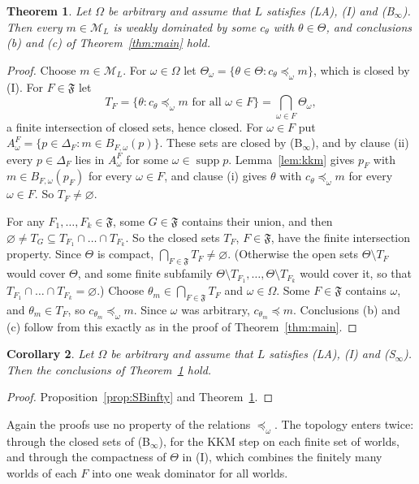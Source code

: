 \documentclass[11pt]{article}
\newtheorem{theorem}{Theorem}[section]
\newtheorem{corollary}[theorem]{Corollary}
\theoremstyle{definition}
\theoremstyle{remark}
\newcommand{\M}{\mathcal M}
\newcommand{\F}{\mathfrak F}
\newcommand{\supp}{\operatorname{supp}}
\begin{document}
\begin{theorem}\label{thm:infinite-bounds}
Let $\Omega$ be arbitrary and assume that $L$ satisfies (LA), (I) and (B$_\infty$). Then every $m\in\M_L$ is weakly dominated by some $c_\theta$ with $\theta\in\Theta$, and conclusions (b) and (c) of Theorem~\ref{thm:main} hold.
\end{theorem}
\begin{proof}
Choose $m\in\M_L$. For $\omega\in\Omega$ let $\Theta_\omega=\{\theta\in\Theta:c_\theta\preceq_\omega m\}$, which is closed by (I). For $F\in\F$ let
\[
 T_F=\{\theta:c_\theta\preceq_\omega m\text{ for all }\omega\in F\} = \bigcap_{\omega\in F}\Theta_\omega,
\]
a finite intersection of closed sets, hence closed. For $\omega\in F$ put $A^F_\omega=\{p\in\Delta_F:m\in B_{F,\omega}(p)\}$. These sets are closed by (B$_\infty$), and by clause (ii) every $p\in\Delta_F$ lies in $A^F_\omega$ for some $\omega\in\supp p$. Lemma~\ref{lem:kkm} gives $p_F$ with $m\in B_{F,\omega}(p_F)$ for every $\omega\in F$, and clause (i) gives $\theta$ with $c_\theta\preceq_\omega m$ for every $\omega\in F$. So $T_F\ne\varnothing$.

For any $F_1,\dots,F_k\in\F$, some $G\in\F$ contains their union, and then $\varnothing\ne T_G\subseteq T_{F_1}\cap\dots\cap T_{F_k}$. So the closed sets $T_F$, $F\in\F$, have the finite intersection property. Since $\Theta$ is compact, $\bigcap_{F\in\F}T_F\neq \varnothing$. (Otherwise the open sets $\Theta\setminus T_F$ would cover $\Theta$, and some finite subfamily $\Theta\setminus T_{F_1},\dots,\Theta\setminus T_{F_k}$ would cover it, so that $T_{F_1}\cap\dots\cap T_{F_k}=\varnothing$.) Choose $\theta_m\in\bigcap_{F\in\F}T_F$ and $\omega\in\Omega$. Some $F\in\F$ contains $\omega$, and $\theta_m\in T_F$, so $c_{\theta_m}\preceq_\omega m$. Since $\omega$ was arbitrary, $c_{\theta_m}\preceq m$. Conclusions (b) and (c) follow from this exactly as in the proof of Theorem~\ref{thm:main}.
\end{proof}

\begin{corollary}\label{cor:infinite}
Let $\Omega$ be arbitrary and assume that $L$ satisfies (LA), (I) and (S$_\infty$). Then the conclusions of Theorem~\ref{thm:infinite-bounds} hold.
\end{corollary}
\begin{proof}
Proposition~\ref{prop:SBinfty} and Theorem~\ref{thm:infinite-bounds}.
\end{proof}
Again the proofs use no property of the relations $\preceq_\omega$. The topology enters twice: through the closed sets of (B$_\infty$), for the KKM step on each finite set of worlds, and through the compactness of $\Theta$ in (I), which combines the finitely many worlds of each $F$ into one weak dominator for all worlds.
\end{document}
